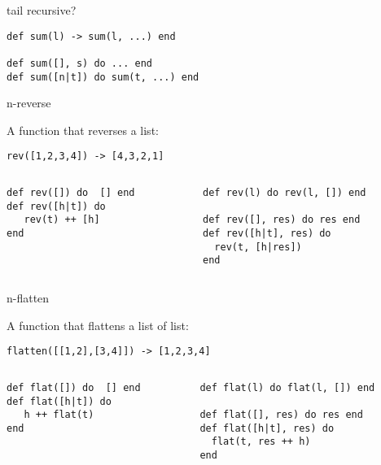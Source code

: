 \begin{frame}[fragile]{tail recursive?}

\begin{verbatim}
def sum(l) -> sum(l, ...) end

def sum([], s) do ... end
def sum([n|t]) do sum(t, ...) end
\end{verbatim}

\end{frame}



\begin{frame}[fragile]{n-reverse}

  A function that reverses a list:

  \hspace{40pt}\verb+rev([1,2,3,4]) -> [4,3,2,1]+
  
\pause

\begin{columns}
  \begin{column}{0.5\linewidth}
\begin{verbatim}
def rev([]) do  [] end
def rev([h|t]) do
   rev(t) ++ [h]
end
\end{verbatim}
  \end{column}
\pause
  \begin{column}{0.5\linewidth}
\begin{verbatim}
def rev(l) do rev(l, []) end

def rev([], res) do res end
def rev([h|t], res) do 
  rev(t, [h|res]) 
end
\end{verbatim}
  \end{column}
  \end{columns}  
\end{frame}


\begin{frame}[fragile]{n-flatten}

  A function that flattens a list of list:

  \hspace{40pt}\verb+flatten([[1,2],[3,4]]) -> [1,2,3,4]+  
\pause

\begin{columns}
  \begin{column}{0.5\linewidth}
\begin{verbatim}
def flat([]) do  [] end
def flat([h|t]) do
   h ++ flat(t)
end
\end{verbatim}
  \end{column}
\pause
  \begin{column}{0.5\linewidth}
\begin{verbatim}
def flat(l) do flat(l, []) end

def flat([], res) do res end
def flat([h|t], res) do 
  flat(t, res ++ h) 
end
\end{verbatim}
  \end{column}
  \end{columns}  
\end{frame}


